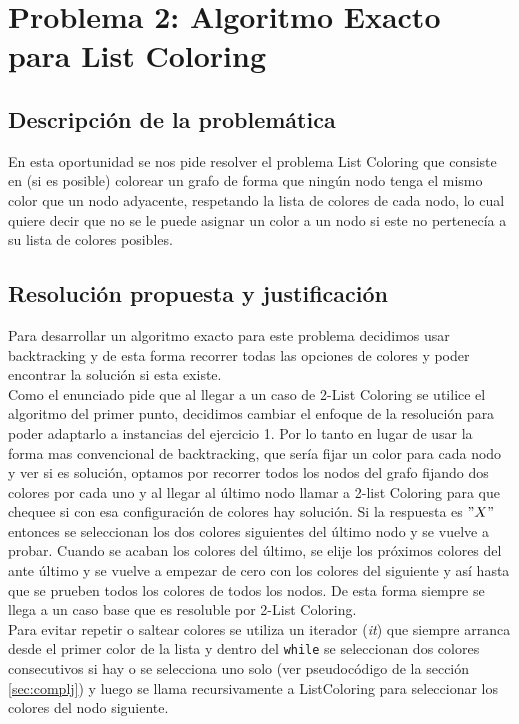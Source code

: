 \newpage
\section{Problema 2: Algoritmo Exacto para List Coloring}

\subsection{Descripción de la problemática}
En esta oportunidad se nos pide resolver el problema List Coloring que consiste en (si es posible) colorear un grafo de forma que ningún nodo tenga el mismo color que un nodo adyacente, respetando la lista de colores de cada nodo, lo cual quiere decir que no se le puede asignar un color a un nodo si este no pertenecía a su lista de colores posibles. 

\subsection{Resolución propuesta y justificación}

Para desarrollar un algoritmo exacto para este problema decidimos usar backtracking y de esta forma recorrer todas las opciones de colores y poder encontrar la solución si esta existe.\\

Como el enunciado pide que al llegar a un caso de 2-List Coloring se utilice el algoritmo del primer punto, decidimos cambiar el enfoque de la resolución para poder adaptarlo a instancias del ejercicio 1. Por lo tanto en lugar de usar la forma mas convencional de backtracking, que sería fijar un color para cada nodo y ver si es solución, optamos por recorrer todos los nodos del grafo fijando dos colores por cada uno y al llegar al último nodo llamar a 2-list Coloring para que chequee si con esa configuración de colores hay solución. Si la respuesta es $"X"$ entonces se seleccionan los dos colores siguientes del último nodo y se vuelve a probar. Cuando se acaban los colores del último, se elije los próximos colores del ante último y se vuelve a empezar de cero con los colores del siguiente y así hasta que se prueben todos los colores de todos los nodos. De esta forma siempre se llega a un caso base que es resoluble por 2-List Coloring.\\

Para evitar repetir o saltear colores se utiliza un iterador (\emph{it}) que siempre arranca desde el primer color de la lista y dentro del \texttt{while} se seleccionan dos colores consecutivos si hay o se selecciona uno solo (ver pseudocódigo de la sección \ref{sec:complj}) y luego se llama recursivamente a ListColoring para seleccionar los colores del nodo siguiente.\\

